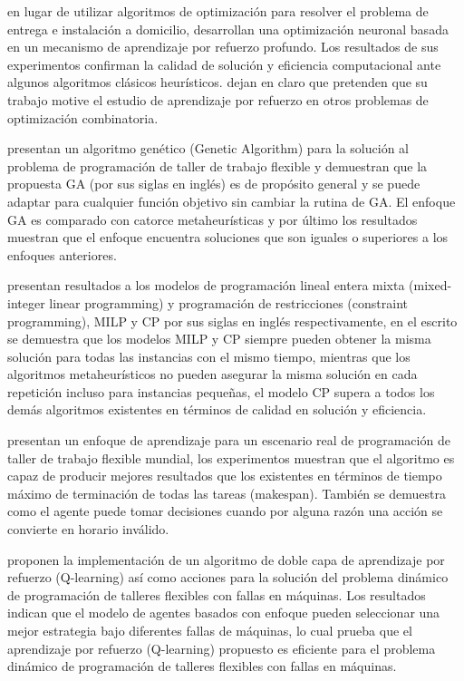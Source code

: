 \documentclass[letterpaper, 10 pt]{article}
\begin{document}
\cite{QIU2022108362} en lugar de utilizar algoritmos de optimización para resolver el problema de entrega e instalación a domicilio, desarrollan una optimización neuronal basada en un mecanismo de aprendizaje por refuerzo profundo. Los resultados de sus experimentos confirman la calidad de solución y  eficiencia computacional ante algunos algoritmos clásicos heurísticos. \cite{QIU2022108362} dejan en claro que pretenden que su trabajo motive el estudio de aprendizaje por refuerzo en otros problemas de optimización combinatoria.

\cite{pezzella2008genetic} presentan un algoritmo genético (Genetic Algorithm) para la solución al problema de programación de taller de trabajo flexible y demuestran que la propuesta GA (por sus siglas en inglés) es de propósito general y se puede adaptar para cualquier función objetivo sin cambiar la rutina de GA. El enfoque GA es comparado con catorce metaheurísticas y por último los resultados muestran que el enfoque encuentra soluciones que son iguales o superiores a los enfoques anteriores.

 \cite{MENG2020106347} presentan resultados a los modelos de programación lineal entera mixta (mixed-integer linear programming) y programación de restricciones (constraint programming), MILP y CP por sus siglas en inglés respectivamente, en el escrito se demuestra que los modelos MILP y CP siempre pueden obtener la misma solución para todas las instancias con el mismo tiempo, mientras que los algoritmos metaheurísticos no pueden asegurar la misma solución en cada repetición incluso para instancias pequeñas, el modelo CP supera a todos los demás algoritmos existentes en términos de calidad en solución y eficiencia. 

\cite{palacio2022q} presentan un enfoque de aprendizaje para un escenario real de programación de taller de trabajo flexible mundial, los experimentos muestran que el algoritmo es capaz de producir mejores resultados que los existentes en términos de tiempo máximo de terminación de todas las tareas (makespan). También se demuestra como el agente puede tomar decisiones cuando por alguna razón una acción se convierte en horario inválido.

\cite{zhao2019improved} proponen la implementación de un algoritmo de doble capa de aprendizaje por refuerzo (Q-learning) así como acciones para la solución del problema dinámico de programación de talleres flexibles con fallas en máquinas. Los resultados indican que el modelo de agentes basados con enfoque pueden seleccionar una mejor estrategia bajo diferentes fallas de máquinas, lo cual prueba que el aprendizaje por refuerzo (Q-learning) propuesto es eficiente para el problema dinámico de programación de talleres flexibles con fallas en máquinas.
\end{document}
